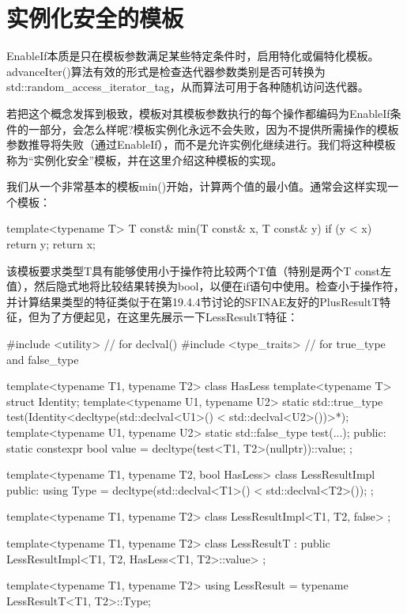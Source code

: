 \section{实例化安全的模板}
EnableIf本质是只在模板参数满足某些特定条件时，启用特化或偏特化模板。advanceIter()算法有效的形式是检查迭代器参数类别是否可转换为std::random\_access\_iterator\_tag，从而算法可用于各种随机访问迭代器。

若把这个概念发挥到极致，模板对其模板参数执行的每个操作都编码为EnableIf条件的一部分，会怎么样呢?模板实例化永远不会失败，因为不提供所需操作的模板参数推导将失败（通过EnableIf），而不是允许实例化继续进行。我们将这种模板称为“实例化安全”模板，并在这里介绍这种模板的实现。

我们从一个非常基本的模板min()开始，计算两个值的最小值。通常会这样实现一个模板：

\begin{cpp}
template<typename T>
T const& min(T const& x, T const& y) {
	if (y < x) {
		return y;
	}
	return x;
}
\end{cpp}

该模板要求类型T具有能够使用小于操作符比较两个T值（特别是两个T const左值），然后隐式地将比较结果转换为bool，以便在if语句中使用。检查小于操作符，并计算结果类型的特征类似于在第19.4.4节讨论的SFINAE友好的PlusResultT特征，但为了方便起见，在这里先展示一下LessResultT特征：

\begin{cpp}
#include <utility> // for declval()
#include <type_traits> // for true_type and false_type

template<typename T1, typename T2>
class HasLess {
	template<typename T> struct Identity;
	template<typename U1, typename U2> static std::true_type
		test(Identity<decltype(std::declval<U1>() < std::declval<U2>())>*);
	template<typename U1, typename U2> static std::false_type
		test(...);
	public:
	static constexpr bool value = decltype(test<T1, T2>(nullptr))::value;
};

template<typename T1, typename T2, bool HasLess>
class LessResultImpl {
	public:
	using Type = decltype(std::declval<T1>() < std::declval<T2>());
};

template<typename T1, typename T2>
class LessResultImpl<T1, T2, false> {};

template<typename T1, typename T2>
class LessResultT
: public LessResultImpl<T1, T2, HasLess<T1, T2>::value> {};

template<typename T1, typename T2>
using LessResult = typename LessResultT<T1, T2>::Type;
\end{cpp}

